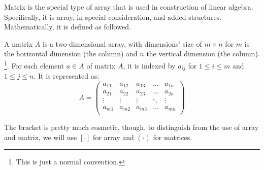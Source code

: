 Matrix is the special type of array that is used in construction of linear algebra. Specifically, it is array, in special consideration, and added structures. Mathematically, it is defined as followed. 
\begin{definition}[Matrix]
    A matrix $A$ is a two-dimensional array, with dimensions' size of $m\times n$ for $m$ is the horizontal dimension (the column) and $n$ the vertical dimension (the column). \footnote{This is just a normal convention.}. For each element $a\in A$ of matrix $A$, it is indexed by $a_{ij}$ for $1\leq i \leq m$ and $1\leq j \leq n$. It is represented as: 
    \begin{equation}
        A = \begin{pmatrix}
            a_{11} & a_{12} & a_{13} & \dots & a_{1n}\\
            a_{21} & a_{22} & a_{23} & \dots & a_{2n}\\
            \vdots & \vdots & \vdots & \ddots & \vdots \\
            a_{m1} & a_{m2} & a_{m3} & \dots & a_{mn}\\
        \end{pmatrix}
    \end{equation}
\end{definition}

The bracket is pretty much cosmetic, though, to distinguish from the use of array and matrix, we will use $[\cdot]$ for array and $(\cdot)$ for matrices. 

